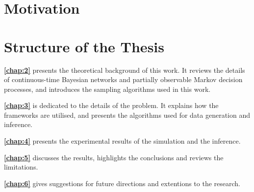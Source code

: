 \section{Motivation}




\section{Structure of the Thesis}
\textbf{\cref{chap:2}} presents the theoretical background of this work. It reviews the details of continuous-time Bayesian networks and partially observable Markov decision processes, and introduces the sampling algorithms used in this work.

\textbf{\cref{chap:3}} is dedicated to the details of the problem. It explains how the frameworks are utilised, and presents the algorithms used for data generation and inference.

\textbf{\cref{chap:4}} presents the experimental results of the simulation and the inference.

\textbf{\cref{chap:5}} discusses the results, highlights the conclusions and reviews the limitations.

\textbf{\cref{chap:6}} gives suggestions for future directions and extentions to the research.